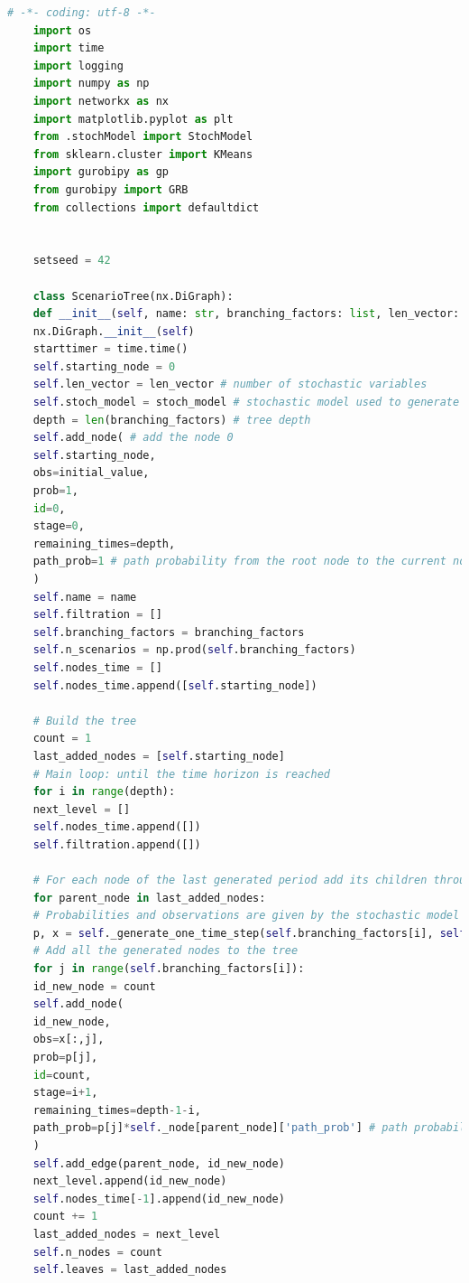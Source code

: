 \documentclass[a4paper,12pt]{article}
\begin{document}
\lstset{style=colorEX}
%
\begin{lstlisting}[language=python,caption={class ScenarioTree},label={lst:class-scenario-tree}]
	# -*- coding: utf-8 -*-
	import os
	import time
	import logging
	import numpy as np
	import networkx as nx
	import matplotlib.pyplot as plt
	from .stochModel import StochModel
	from sklearn.cluster import KMeans
	import gurobipy as gp
	from gurobipy import GRB
	from collections import defaultdict
	
	
	setseed = 42
	
	class ScenarioTree(nx.DiGraph):
	def __init__(self, name: str, branching_factors: list, len_vector: int, initial_value, stoch_model: StochModel):
	nx.DiGraph.__init__(self)
	starttimer = time.time()
	self.starting_node = 0
	self.len_vector = len_vector # number of stochastic variables
	self.stoch_model = stoch_model # stochastic model used to generate the tree
	depth = len(branching_factors) # tree depth
	self.add_node( # add the node 0  
	self.starting_node,
	obs=initial_value,
	prob=1,
	id=0,
	stage=0,
	remaining_times=depth,
	path_prob=1 # path probability from the root node to the current node
	)    
	self.name = name
	self.filtration = []
	self.branching_factors = branching_factors
	self.n_scenarios = np.prod(self.branching_factors)
	self.nodes_time = []
	self.nodes_time.append([self.starting_node])
	
	# Build the tree
	count = 1
	last_added_nodes = [self.starting_node]
	# Main loop: until the time horizon is reached
	for i in range(depth):
	next_level = []
	self.nodes_time.append([])
	self.filtration.append([])
	
	# For each node of the last generated period add its children through the StochModel class
	for parent_node in last_added_nodes:
	# Probabilities and observations are given by the stochastic model chosen
	p, x = self._generate_one_time_step(self.branching_factors[i], self.nodes[parent_node])
	# Add all the generated nodes to the tree
	for j in range(self.branching_factors[i]):
	id_new_node = count
	self.add_node(
	id_new_node,
	obs=x[:,j],
	prob=p[j],
	id=count,
	stage=i+1,
	remaining_times=depth-1-i,
	path_prob=p[j]*self._node[parent_node]['path_prob'] # path probability from the root node to the current node
	)
	self.add_edge(parent_node, id_new_node)
	next_level.append(id_new_node)
	self.nodes_time[-1].append(id_new_node)
	count += 1
	last_added_nodes = next_level
	self.n_nodes = count
	self.leaves = last_added_nodes
	

\end{lstlisting}
\end{document}
